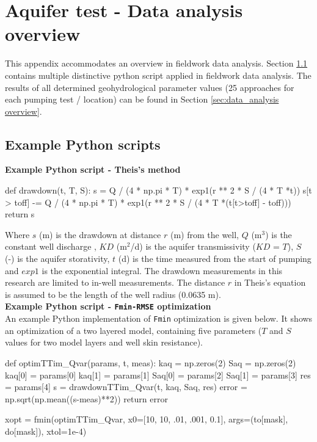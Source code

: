 \chapter{Aquifer test - Data analysis overview}
\label{chapter:Extense_fieldwork_analysis}

This appendix accommodates an overview in fieldwork data analysis. Section \ref{sec:python_analysis} contains multiple distinctive python script applied in fieldwork data analysis. The results of all determined geohydrological parameter values (25 approaches for each pumping test / location) can be found in Section \ref{sec:data_analysis overview}.   

\section{Example Python scripts}
\label{sec:python_analysis}
\bigskip
\textbf{Example Python script - Theis's method}
\begin{python}[h!]
def drawdown(t, T, S):
    s = Q / (4 * np.pi * T) * exp1(r ** 2 * S / (4 * T *t))
    s[t > toff] -= Q / (4 * np.pi * T) * exp1(r ** 2 * S / (4 * T *(t[t>toff] - toff)))   
    return s
\end{python}

Where $s$ (m) is the drawdown at distance $r$ (m) from the well, $Q$ (m$^{3}$) is the constant well discharge , $KD$ (m$^{2}$/d) is the aquifer transmissivity ($KD$ = $T$), $S$ (-) is the aquifer storativity, $t$ (d) is the time measured from the start of pumping and $exp1$ is the exponential integral. The drawdown measurements in this research are limited to in-well measurements. The distance $r$ in Theis's equation is assumed to be the length of the well radius (0.0635 m). \\

\textbf{Example Python script - \texttt{Fmin-RMSE} optimization} \\
An example Python implementation of \texttt{Fmin} optimization is given below. It shows an optimization of a two layered model, containing five parameters ($T$ and $S$ values for two model layers and well skin resistance). 

\begin{python}[h!]
def optimTTim_Qvar(params, t, meas):
    kaq = np.zeros(2)
    Saq = np.zeros(2)
    kaq[0] = params[0]             
    kaq[1] = params[1]
    Saq[0] = params[2]
    Saq[1] = params[3]
    res = params[4]
    s = drawdownTTim_Qvar(t, kaq, Saq, res)
    error = np.sqrt(np.mean((s-meas)**2)) 
    return error

xopt = fmin(optimTTim_Qvar, x0=[10, 10, .01, .001, 0.1], args=(to[mask], do[mask]), xtol=1e-4)
\end{python}

